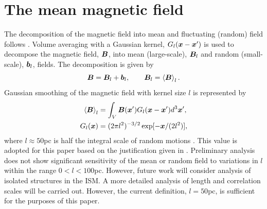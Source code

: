 \documentclass[useAMS,usenatbib]{mn2e}
\begin{document}
\section{The mean magnetic field}

The decomposition of the magnetic field into mean and fluctuating (random) 
field follows \MHD.
Volume averaging with a Gaussian kernel, $G_{l}(\boldsymbol{x}-\boldsymbol{x}')$ is used to decompose the magnetic field, $\boldsymbol{B}$, into mean (large-scale), $\boldsymbol{B}_{l}$ and random (small-scale), $\boldsymbol{b}_{l}$, fields. The decomposition is given by 
\begin{equation}
\boldsymbol{B} = \boldsymbol{B}_{l}+\boldsymbol{b}_{l},\qquad \boldsymbol{B}_{l} = \left<\boldsymbol{B}\right>_{l}. \label{decomp} 
\end{equation}
Gaussian smoothing of the magnetic field with kernel size $l$ is represented by
\begin{align}
\left<\boldsymbol{B}\right>_{l}&=\int_{V}\boldsymbol{B}(\boldsymbol{x}')G_{l}(\boldsymbol{x}-\boldsymbol{x}')d^{3}\boldsymbol{x}',\\
G_{l}(\boldsymbol{x})&=(2\pi l^2)^{-3/2}\exp[-\boldsymbol{x}/(2l^2)],\nonumber
\label{gauss}
\end{align} 
where $l\approx50$pc is half the integral scale of random motions \citep{GSSFM13}. This value is adopted for this paper based on the justification given in \citep{gent2}.  Preliminary analysis does not show significant sensitivity of the mean or random field to variations in $l$ within the range $0<l<100$pc. However, future work will consider analysis of isolated structures in the ISM. A more detailed analysis of length and correlation scales will be carried out. However, the current definition, $l=50$pc, is sufficient for the purposes of this paper. 
\end{document}

